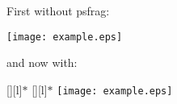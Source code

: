 


First without psfrag:

        \texttt{[image: example.eps]}

and now with:

        \psfragscanon
        [][l]{$\ast$}
        [][l]{$\ast$}
        \texttt{[image: example.eps]}


\bye
